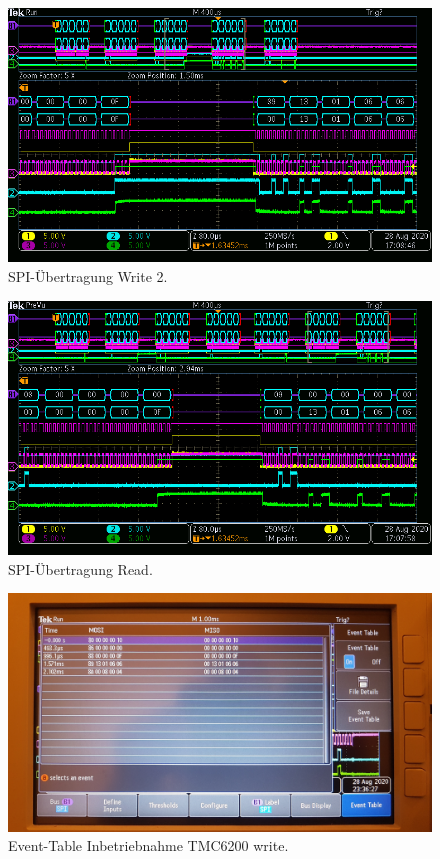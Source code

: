 \begin{figure}[H]
\center
\includegraphics[width = \textwidth]{graphics/TMC6200_Beschreiben}
\caption{SPI-Übertragung Write 2.}
\label{fig:TMC6200_Beschreiben}
\end{figure}

\begin{figure}[H]
\center
\includegraphics[width = \textwidth]{graphics/TMC6200_Lesen}
\caption{SPI-Übertragung Read.}
\label{fig:TMC6200_Lesen}
\end{figure}

\begin{figure}[H]
\center
\includegraphics[width = \textwidth]{graphics/TMC6200_EventTable_Beschreiben_Bild}
\caption{Event-Table Inbetriebnahme TMC6200 write.}
\label{fig:TMC6200_EventTable_Beschreiben_Bild}
\end{figure}

